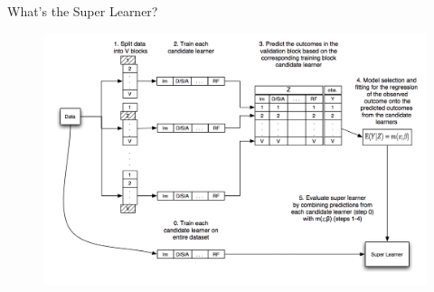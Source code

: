 \begin{frame}{What's the Super Learner?}

\begin{figure}
\includegraphics[width=\textwidth]{./Figures/sup-learn.jpg}
\end{figure}

\end{frame}


